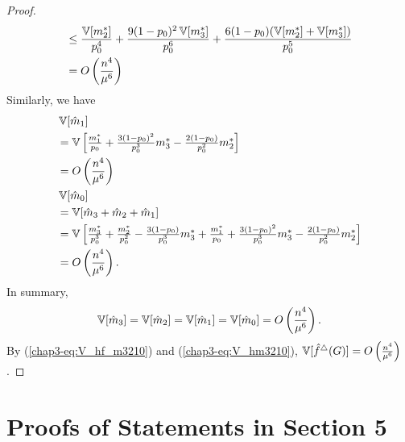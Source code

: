 \begin{proof}
\begin{align*}
    &\leq \frac{\operatorname{\mathbb{V}}[m_2^*]}{p_0^4} + \frac{9(1-p_0)^2\operatorname{\mathbb{V}}[m_3^*]}{p_0^6} + \frac{6(1-p_0)(\operatorname{\mathbb{V}}[m_2^*]+\operatorname{\mathbb{V}}[m_3^*])}{p_0^5} \\
    &= O\left(\frac{n^4}{\mu^6}\right) \\
\end{align*}
Similarly, we have
\begin{align*}
    &\operatorname{\mathbb{V}}[\hat{m}_1] \\
    &= \textstyle{\operatorname{\mathbb{V}}\left[\frac{m_1^*}{p_0} + \frac{3(1-p_0)^2}{p_0^3}m_3^* - \frac{2(1-p_0)}{p_0^2}m_2^* \right]} \\
    &= O\left(\frac{n^4}{\mu^6}\right) \\
    &\operatorname{\mathbb{V}}[\hat{m}_0] \\
    &= \operatorname{\mathbb{V}}[\hat{m}_3 + \hat{m}_2 + \hat{m}_1]\\
    &=
    \textstyle{\operatorname{\mathbb{V}}\left[\frac{m_3^*}{p_0^3}
    + \frac{m_2^*}{p_0^2} - \frac{3(1-p_0)}{p_0^3}m_3^*
    + \frac{m_1^*}{p_0} + \frac{3(1-p_0)^2}{p_0^3}m_3^* - \frac{2(1-p_0)}{p_0^2}m_2^*
     \right]} \\
    &= O\left(\frac{n^4}{\mu^6}\right).
\end{align*}
In summary,
\begin{align}
    \operatorname{\mathbb{V}}[\hat{m}_3] = \operatorname{\mathbb{V}}[\hat{m}_2] = \operatorname{\mathbb{V}}[\hat{m}_1] = \operatorname{\mathbb{V}}[\hat{m}_0] = O\left(\frac{n^4}{\mu^6}\right).
    \label{chap3-eq:V_hm3210}
\end{align}
By (\ref{chap3-eq:V_hf_m3210}) and (\ref{chap3-eq:V_hm3210}),
$\operatorname{\mathbb{V}}[\hat{f}^\triangle(G)] = O\left(\frac{n^4}{\mu^6}\right)$.
\end{proof}

\section{Proofs of Statements in Section 5}
\label{chap3-sec:triangle_proof}

